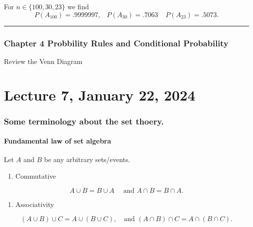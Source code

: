 \documentclass[
]{book}
\providecommand{\tightlist}{%
  \setlength{\itemsep}{0pt}\setlength{\parskip}{0pt}}
\theoremstyle{definition}
\theoremstyle{definition}
\theoremstyle{definition}
\theoremstyle{definition}
\theoremstyle{remark}
\begin{document}
For \(n\in\{100, 30, 23\}\) we find
\[P(A_{100})= .9999997,\;\;\; P(A_{30})=.7063 \;\;\;\; P(A_{23})=.5073.\]

\begin{center}\rule{0.5\linewidth}{0.5pt}\end{center}

\hypertarget{chapter-4-probbility-rules-and-conditional-probability}{%
\subsection{Chapter 4 Probbility Rules and Conditional Probability}\label{chapter-4-probbility-rules-and-conditional-probability}}

Review the Venn Diagram

\hypertarget{lecture-7-january-22-2024}{%
\chapter{Lecture 7, January 22, 2024}\label{lecture-7-january-22-2024}}

\hypertarget{some-terminology-about-the-set-thoery.}{%
\subsection{Some terminology about the set thoery.}\label{some-terminology-about-the-set-thoery.}}

\hypertarget{fundamental-law-of-set-algebra}{%
\subsubsection{Fundamental law of set algebra}\label{fundamental-law-of-set-algebra}}

Let \(A\) and \(B\) be any arbitrary sets/events.

\begin{enumerate}
\def\labelenumi{\arabic{enumi}.}
\tightlist
\item
  Commutative
\end{enumerate}

\[
  A\cup B = B\cup A \quad \text{ and } A\cap B = B\cap A.
\]

\begin{enumerate}
\def\labelenumi{\arabic{enumi}.}
\setcounter{enumi}{1}
\tightlist
\item
  Associativity
\end{enumerate}

\[
  (A\cup B)\cup C = A \cup (B\cup C), \quad \text{and } (A\cap B)\cap C =  A \cap (B \cap C).
\]
\end{document}
